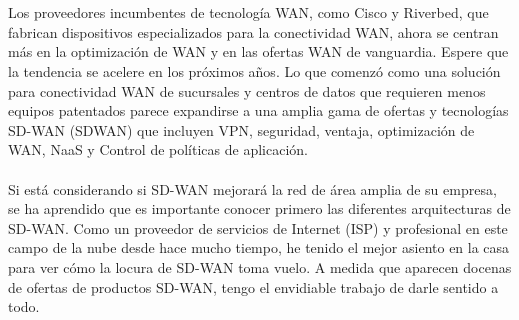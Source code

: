 \\
\\
Los proveedores incumbentes de tecnología WAN, como Cisco y Riverbed, que fabrican dispositivos especializados para la conectividad WAN, ahora se centran más en la optimización de WAN y en las ofertas WAN de vanguardia.
Espere que la tendencia se acelere en los próximos años. Lo que comenzó como una
solución para conectividad WAN de sucursales y centros de datos que requieren menos equipos patentados parece expandirse a una amplia gama de ofertas y tecnologías SD-WAN (SDWAN) que incluyen VPN, seguridad, ventaja, optimización de WAN, NaaS y Control de políticas de aplicación.
\\
\\
Si está considerando si SD-WAN mejorará la red de área amplia de su empresa, se ha aprendido que es importante conocer primero las diferentes arquitecturas de SD-WAN.
Como un proveedor de servicios de Internet (ISP) y profesional en este campo  de la nube desde hace
mucho tiempo, he tenido el mejor asiento en la casa para ver cómo la locura de SD-WAN toma vuelo. A medida que aparecen docenas de ofertas de productos SD-WAN, tengo el envidiable trabajo de darle sentido a todo.


















